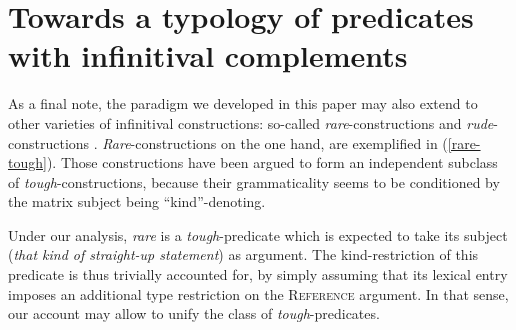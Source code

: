 \documentclass[11pt]{article}
\begin{document}
\section{Towards a typology of predicates with infinitival complements}\label{sec:conclusion}		
	 As a final note, the paradigm we developed in this paper may also extend to other varieties of infinitival constructions: so-called \textit{rare}-constructions \cite{Fleisher2015} and \textit{rude}-constructions \cite{Stowell1991, Bennis2000, Bennis2004, Landau2006, Landau2009}. \textit{Rare}-constructions on the one hand, are exemplified in (\ref{rare-tough}). Those constructions have been argued to form an independent subclass of \textit{tough}-constructions, because their grammaticality seems to be conditioned by the matrix subject being ``kind''-denoting.
	\begin{exe}
		 \label{rare-tough}
	\end{exe}
	Under our analysis, \textit{rare} is a \textit{tough}-predicate which is expected to take its subject (\textit{that kind of straight-up statement}) as argument. The kind-restriction of this predicate is thus trivially accounted for, by simply assuming that its lexical entry imposes an additional type restriction on the \textsc{Reference} argument. In that sense, our account may allow to unify the class of \textit{tough}-predicates.\\
\end{document}
